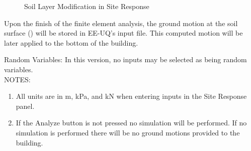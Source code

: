\begin{figure}[!htbp]
  \caption{Soil Layer Modification in Site Response }
  \label{fig:s3hark3}
\end{figure}

Upon the finish of the finite element analysis, the ground motion at the soil surface () will be stored in EE-UQ's input file.
This computed motion will be later applied to the bottom of the building.

Random Variables: In this version, no inputs may be selected as being random variables.\\

NOTES: 
\begin{enumerate}
\item All units are in m, kPa, and kN when entering inputs in the Site Response panel.
\item If the Analyze button is not pressed no simulation will be performed. If no simulation is performed there will be no ground motions provided to the building.
\end{enumerate}
